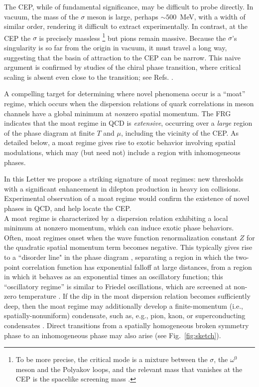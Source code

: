 \documentclass[twocolumn,prd,superscriptaddress, colorlinks, linkcolor=refcol, citecolor=refcol, urlcolor=refcol]{revtex4-2}
\begin{document}
The CEP, while of fundamental significance, may be difficult to probe directly.  In vacuum, the mass of the $\sigma$ meson is large, perhaps $\sim\! 500$~MeV, 
with a width of similar order, 
rendering it difficult to extract experimentally. 
In contrast, at the CEP the $\sigma$ is precisely massless \footnote{To be more precise, the critical mode is a mixture between the $\sigma$, the $\omega^0$ meson and the Polyakov loops, and the relevant mass that vanishes at the CEP is the spacelike screening mass \cite{Haensch:2023sig}.} but pions remain massive.  Because the $\sigma$'s singularity is so far from the origin in vacuum, it must travel a long way, suggesting that the basin of attraction to the CEP can be narrow.
This naive argument is confirmed by 
studies of the chiral phase transition, where critical scaling is absent even 
close to the transition; see Refs.
\cite{Braun:2010vd, Schaefer:2011ex, Fu:2019hdw, Braun:2020ada, Gao:2021vsf, Fu:2023lcm, Bernhardt:2023hpr, Braun:2023qak, Lu:2023mkn,Fu:2024rto}. 

A compelling target for determining where novel phenomena occur is a ``moat'' regime, which occurs when the dispersion relations of quark correlations
in meson channels have a global minimum at {\it non}zero spatial momentum.
The 
FRG \cite{Fu:2019hdw,Fu:2024rto} indicates  
that the moat regime in QCD is
 {\it extensive}, 
occurring over a {\it large} region of the phase diagram at finite $T$ and $\mu$, 
including the vicinity of the CEP. 
As detailed below, a moat regime gives rise to
exotic behavior involving spatial modulations, which may (but need not) include
a region with inhomogeneous phases.

In this Letter we propose a striking signature of moat regimes: new
thresholds with a significant enhancement in dilepton production in heavy ion collisions. Experimental observation of a moat regime would confirm the existence of
novel phases in QCD, and help locate the CEP.\\

A moat regime is characterized by a dispersion relation exhibiting a local minimum at nonzero momentum, which can induce exotic phase behaviors.
Often, moat regimes onset when the wave function renormalization constant $Z$ for the quadratic spatial momentum term becomes negative.
This typically gives rise to a ``disorder line" in the phase diagram
\cite{stephenson_ising_1970,Schindler:2019ugo,Schindler:2021otf}, 
separating a region in which the two-point correlation function has exponential falloff at large distances, from a region in which
it behaves as an exponential times an oscillatory function;
this ``oscillatory regime'' is similar to Friedel oscillations, which are screened at non-zero temperature \cite{fetter2012quantum}.
If the dip in the moat dispersion relation
becomes sufficiently deep, then the
moat regime may additionally
develop a finite-momentum
(i.e., spatially-nonuniform) condensate, such as, e.g., pion, kaon, or superconducting condensates \cite{Overhauser:1960,Migdal:1971,Sawyer:1972cq,Migdal:1973zm,Kaplan:1986yq, Kryjevski:2005qq, Schaefer:2006ds}.
Direct transitions
from a spatially homogeneous broken symmetry phase to 
an inhomogeneous phase may also arise (see Fig.\ \ref{fig:sketch}).
\end{document}

